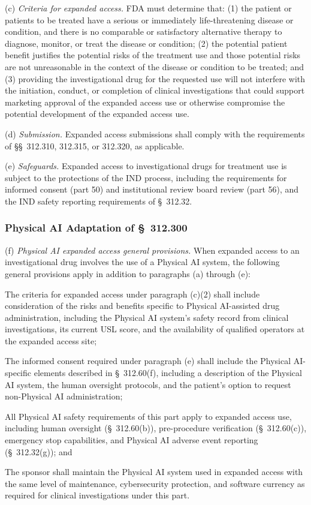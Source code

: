 \documentclass[11pt]{article}
\begin{document}
(c) \textit{Criteria for expanded access.} FDA must determine that: (1) the patient or patients to be treated have a serious or immediately life-threatening disease or condition, and there is no comparable or satisfactory alternative therapy to diagnose, monitor, or treat the disease or condition; (2) the potential patient benefit justifies the potential risks of the treatment use and those potential risks are not unreasonable in the context of the disease or condition to be treated; and (3) providing the investigational drug for the requested use will not interfere with the initiation, conduct, or completion of clinical investigations that could support marketing approval of the expanded access use or otherwise compromise the potential development of the expanded access use.

(d) \textit{Submission.} Expanded access submissions shall comply with the requirements of \S\S~312.310, 312.315, or 312.320, as applicable.

(e) \textit{Safeguards.} Expanded access to investigational drugs for treatment use is subject to the protections of the IND process, including the requirements for informed consent (part 50) and institutional review board review (part 56), and the IND safety reporting requirements of \S~312.32.

\subsubsection{Physical AI Adaptation of \S~312.300}

(f) \textit{Physical AI expanded access general provisions.} When expanded access to an investigational drug involves the use of a Physical AI system, the following general provisions apply in addition to paragraphs (a) through (e):

\begin{description}[leftmargin=0.8cm,style=sameline]
\item[(i)] The criteria for expanded access under paragraph (c)(2) shall include consideration of the risks and benefits specific to Physical AI-assisted drug administration, including the Physical AI system's safety record from clinical investigations, its current USL score, and the availability of qualified operators at the expanded access site;
\item[(ii)] The informed consent required under paragraph (e) shall include the Physical AI-specific elements described in \S~312.60(f), including a description of the Physical AI system, the human oversight protocols, and the patient's option to request non-Physical AI administration;
\item[(iii)] All Physical AI safety requirements of this part apply to expanded access use, including human oversight (\S~312.60(b)), pre-procedure verification (\S~312.60(c)), emergency stop capabilities, and Physical AI adverse event reporting (\S~312.32(g)); and
\item[(iv)] The sponsor shall maintain the Physical AI system used in expanded access with the same level of maintenance, cybersecurity protection, and software currency as required for clinical investigations under this part.
\end{description}
\end{document}
